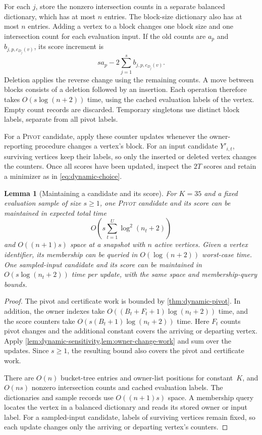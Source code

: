 \documentclass[11pt,letterpaper]{article}
\newtheorem{lemma}[theorem]{Lemma}
\theoremstyle{definition}
\theoremstyle{remark}
\newcommand{\1}{\mathbf{1}}
\newcommand{\Pivot}{\textnormal{\textsc{Pivot}}}
\begin{document}
For each $j$, store the nonzero intersection counts in a separate balanced dictionary, which has at most $n$ entries.  The block-size dictionary also has at most $n$ entries.  Adding a vertex to a block changes one block size and one intersection count for each evaluation input.  If the old counts are $a_p$ and $b_{j,p,c_{D_j}(v)}$, its score increment is
\[
 s a_p-2\sum_{j=1}^s b_{j,p,c_{D_j}(v)}.
\]
Deletion applies the reverse change using the remaining counts.  A move between blocks consists of a deletion followed by an insertion.  Each operation therefore takes $O(s\log(n+2))$ time, using the cached evaluation labels of the vertex.  Empty count records are discarded.  Temporary singletons use distinct block labels, separate from all pivot labels.

For a \Pivot{} candidate, apply these counter updates whenever the owner-reporting procedure changes a vertex's block.  For an input candidate $Y'_{i,t}$, surviving vertices keep their labels, so only the inserted or deleted vertex changes the counters.  Once all scores have been updated, inspect the $2T$ scores and retain a minimizer as in \cref{eq:dynamic-choice}.

\begin{lemma}[Maintaining a candidate and its score]\label{lem:dynamic-scores}
For $K=35$ and a fixed evaluation sample of size $s\ge1$, one \Pivot{} candidate and its score can be maintained in expected total time
\[
 O\!\left(s\sum_{t=1}^U\log^2(n_t+2)\right)
\]
and $O((n+1)s)$ space at a snapshot with $n$ active vertices.  Given a vertex identifier, its membership can be queried in $O(\log(n+2))$ worst-case time.  One sampled-input candidate and its score can be maintained in $O(s\log(n_t+2))$ time per update, with the same space and membership-query bounds.
\end{lemma}

\begin{proof}
The pivot and certificate work is bounded by \cref{thm:dynamic-pivot}.  In addition, the owner indexes take $O((B_t+F_t+1)\log(n_t+2))$ time, and the score counters take $O(s(B_t+1)\log(n_t+2))$ time.  Here $F_t$ counts pivot changes and the additional constant covers the arriving or departing vertex.  Apply \cref{lem:dynamic-sensitivity,lem:owner-change-work} and sum over the updates.  Since $s\ge1$, the resulting bound also covers the pivot and certificate work.

There are $O(n)$ bucket-tree entries and owner-list positions for constant~$K$, and $O(ns)$ nonzero intersection counts and cached evaluation labels.  The dictionaries and sample records use $O((n+1)s)$ space.  A membership query locates the vertex in a balanced dictionary and reads its stored owner or input label.  For a sampled-input candidate, labels of surviving vertices remain fixed, so each update changes only the arriving or departing vertex's counters.
\end{proof}
\end{document}
